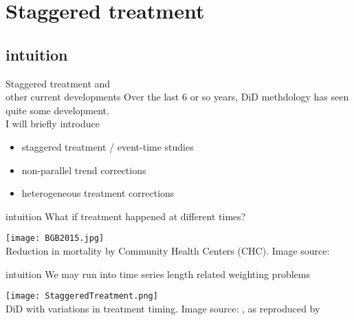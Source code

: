 \documentclass[aspectratio=169]{beamer}
\begin{document}
\section{Staggered treatment}

	\subsection{intuition}
		\begin{frame}{Staggered treatment and \\ other current developments}
			Over the last 6 or so years, DiD methdology has seen quite some development.
			\\ \vspace*{.25cm}
			I will briefly introduce
			\\ \vspace*{.25cm}
			\begin{itemize}
				\item<2-> staggered treatment / event-time studies
				\item<3-> non-parallel trend corrections
				\item<4-> heterogeneous treatment corrections
			\end{itemize}
		\end{frame}

		\begin{frame}{intuition}
			What if treatment happened at different times?
			\begin{center}
				\texttt{[image: BGB2015.jpg]}
				\\ \tiny{Reduction in mortality by Community Health Centers (CHC). Image source: \cite{Bailey2015}}
			\end{center}
		\end{frame}


		\begin{frame}{intuition}
			We may run into time series length related weighting problems
			\begin{center}
				\texttt{[image: StaggeredTreatment.png]}
				\\ \tiny{DiD with variations in treatment timing. Image source: \cite{Goodman-Bacon2018}, as reproduced by \href{https://andrewcbaker.netlify.app/2019/09/25/difference-in-differences-methodology/}{\underline{}}}
			\end{center}
		\end{frame}
\end{document}
